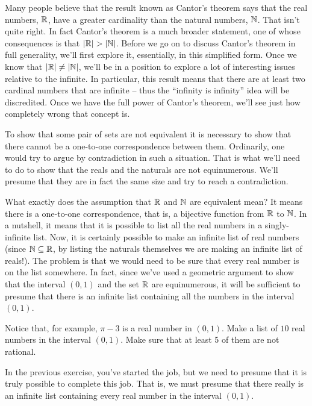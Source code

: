 Many people believe that the result known as Cantor's theorem says that
the real numbers, ${\mathbb R}$, have a greater cardinality than the natural numbers, ${\mathbb N}$.
That isn't quite right.  In fact Cantor's theorem is a much broader statement,
one of whose consequences is that $|{\mathbb R}| > |{\mathbb N}|$.  Before we go 
on to discuss Cantor's theorem in full generality, we'll first explore it, 
essentially, in this simplified form.
Once we know that $|{\mathbb R}| \neq |{\mathbb N}|$, we'll be in a position to 
explore a lot of
interesting issues relative to the infinite.  In particular, this result 
means that there are at least two cardinal numbers that are 
infinite -- thus the ``infinity is infinity'' idea will be discredited.  
Once we have the full power of Cantor's
theorem, we'll see just how completely wrong that concept is.  

To show that some pair of sets are not equivalent it is necessary to show
that there cannot be a one-to-one correspondence between them.  Ordinarily,
one would try to argue by contradiction in such a situation.  That is what
we'll need to do to show that the reals and the naturals are not equinumerous.
We'll presume that they are in fact the same size and try to reach a
contradiction.

What exactly does the assumption that ${\mathbb R}$ and ${\mathbb N}$ are 
equivalent mean?
It means there is a one-to-one correspondence, that is, a bijective function
from ${\mathbb R}$ to ${\mathbb N}$.   In a nutshell, it means that it is 
possible to list all the real
numbers in a singly-infinite list.  Now, it is certainly possible to make an
infinite list of real numbers (since ${\mathbb N} \subseteq {\mathbb R}$, 
by listing the naturals themselves
we are making an infinite list of reals!).  The problem is that we would need
to be sure that every real number is on the list somewhere.  In fact, since
we've used a geometric argument to show that the interval $(0, 1)$ and the 
set ${\mathbb R}$ are equinumerous, it will be sufficient to presume that there 
is an infinite list containing all the numbers in the interval $(0, 1)$.

\begin{exer}  Notice that, for example,  $\pi-3$ is a real number in 
$(0, 1)$.  Make
a list of $10$ real numbers in the interval $(0, 1)$.   Make sure that 
at least 5 of them are not rational.
\end{exer}

In the previous exercise, you've started the job, but we need to presume
that it is truly possible to complete this job.  That is, we must presume 
that there really is an infinite list containing every real number in 
the interval $(0, 1)$.

